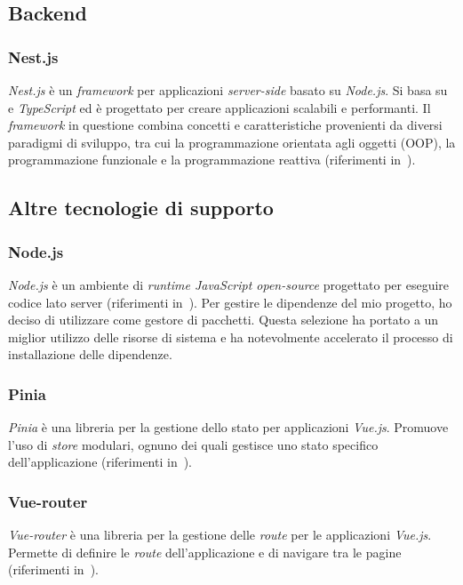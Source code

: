 \subsection{Backend}\label{subsec:backend}
\subsubsection{Nest.js}\label{subsubsec:nest-js}
\textit{Nest.js} è un \textit{framework} per applicazioni \textit{server-side} basato su \textit{Node.js}. Si basa su  e \textit{TypeScript} ed è progettato per creare applicazioni scalabili e performanti.
Il \textit{framework} in questione combina concetti e caratteristiche provenienti da diversi paradigmi di sviluppo, tra cui la programmazione orientata agli oggetti (OOP), la programmazione funzionale e la programmazione reattiva (riferimenti in~\cite{site:nest.js}).

\subsection{Altre tecnologie di supporto}\label{subsec:altre-tecnologie-di-supporto}
\subsubsection{Node.js}\label{subsubsec:node-js}
\textit{Node.js} è un ambiente di \textit{runtime JavaScript open-source} progettato per eseguire codice lato server (riferimenti in~\cite{site:node}). Per gestire le dipendenze del mio progetto,
ho deciso di utilizzare  come gestore di pacchetti. Questa selezione ha portato a un miglior utilizzo delle risorse di sistema e ha notevolmente accelerato il processo di 
installazione delle dipendenze.
\subsubsection{Pinia}\label{subsubsec:pinia}
\textit{Pinia} è una libreria per la gestione dello stato per applicazioni \textit{Vue.js}. Promuove l'uso di \textit{store} modulari, ognuno dei quali gestisce uno stato specifico dell'applicazione (riferimenti in~\cite{site:pinia}).
\subsubsection{Vue-router}\label{subsubsec:vue-router}
\textit{Vue-router} è una libreria per la gestione delle \textit{route} per le applicazioni \textit{Vue.js}. Permette di definire le \textit{route} dell'applicazione e di navigare tra le pagine (riferimenti in~\cite{site:vue-router}).


